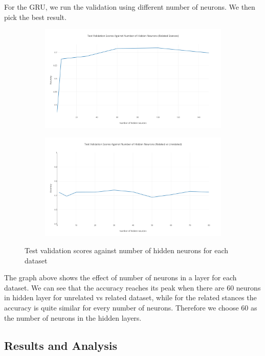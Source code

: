 \documentclass[11.5pt]{article}
\begin{document}
For the GRU, we run the validation using different number of neurons. We then pick the best result.

\begin{figure}[h!]
  \begin{subfigure}{.5\textwidth}
    \centering
    \includegraphics[width=.9\linewidth]{plot_9}
  \end{subfigure}
  \begin{subfigure}{.5\textwidth}
    \centering
    \includegraphics[width=.9\linewidth]{plot_11}
  \end{subfigure}
  \caption{Test validation scores against number of hidden neurons for each dataset}
  \label{fig:neurons}
\end{figure}

The graph above shows the effect of number of neurons in a layer for each dataset. We can see that the accuracy reaches its peak when there are 60 neurons in hidden layer for unrelated vs related dataset, while for the related stances
the accuracy is quite similar for every number of neurons. Therefore we choose 60 as the number of neurons in the hidden layers.

\subsection{Results and Analysis}
\end{document}
